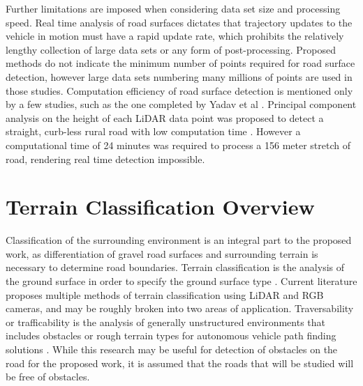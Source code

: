 \documentclass[numbered,pdftex]{ohio-etd}
\begin{document}
{{		{Further limitations are imposed when considering data set size and processing speed. Real time analysis of road surfaces dictates that trajectory updates to the vehicle in motion must have a rapid update rate, which prohibits the relatively lengthy collection of large data sets or any form of post-processing. Proposed methods \cite{yadav_extraction_2017,yadav_road_2018,yadav_rural_2018,yadav_pole-shaped_2015,miyazaki_line-based_2014,yang_semi-automated_2013,liu_new_2013,qiu_fast_2016} do not indicate the minimum number of points required for road surface detection, however large data sets numbering many millions of points are used in those studies. Computation efficiency of road surface detection is mentioned only by a few studies, such as the one completed by Yadav et al \cite{yadav_road_2018}. Principal component analysis on the height of each LiDAR data point was proposed to detect a straight, curb-less rural road with low computation time \cite{yadav_road_2018}. However a computational time of 24 minutes was required to process a 156 meter stretch of road, rendering real time detection impossible.} 
			
	} %
	
%	
%	
	
	\section{Terrain Classification Overview}{
		
		{Classification of the surrounding environment is an integral part to the proposed work, as differentiation of gravel road surfaces and surrounding terrain is necessary to determine road boundaries. Terrain classification is the analysis of the ground surface in order to specify the ground surface type \cite{laible_3d_2012,laible_terrain_2013,laible_map_building,rasmussen_combining_2002,reymann_improving_2015,walas_terrain_2014,wietrzykowski_boosting_2014,wang_road_nodate}. Current literature proposes multiple methods of terrain classification using LiDAR and RGB cameras, and may be roughly broken into two areas of application. Traversability or trafficability is the analysis of generally unstructured environments that includes obstacles or rough terrain types for autonomous vehicle path finding solutions  \cite{schilling_geometric_2017,ojeda_terrain_2006,coombs_driving_2000,stavens_self-supervised_nodate,belter_rough_2010,bartoszyk_terrain-aware_2017,noauthor_fusion_nodate,li_rugged_2019,wilson_terrain_2014,siva_robot_2019}. While this research may be useful for detection of obstacles on the road for the proposed work, it is assumed that the roads that will be studied will be free of obstacles.}
		
}}
\end{document}
